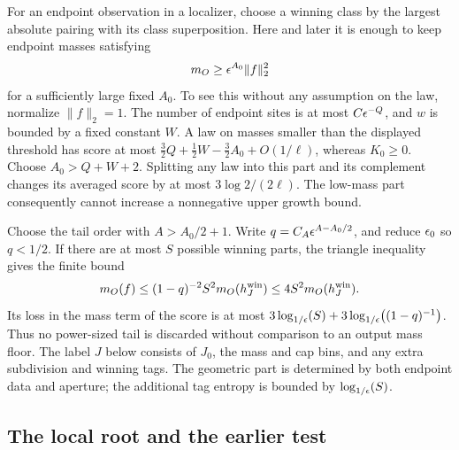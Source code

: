 For an endpoint observation in a localizer, choose a winning class
by the largest absolute pairing with its class superposition.
Here and later it is enough to keep endpoint masses satisfying
\begin{equation}
 m_O\ge\epsilon^{A_0}\|f\|_2^2
 \label{eq:packet-output-floor}
\end{equation}
for a sufficiently large fixed \(A_0\).  To see this without any
assumption on the law, normalize \(\|f\|_2=1\).  The number of
endpoint sites is at most \(C\epsilon^{-Q}\), and \(w\) is bounded
by a fixed constant \(W\).  A law on masses smaller than the
displayed threshold has score at most
\(\frac32 Q+\frac12W-\frac32A_0+O(1/\ell)\), whereas \(K_0\ge0\).
Choose \(A_0>Q+W+2\).  Splitting any law into this part and its
complement changes its averaged score by at most
\(3\log 2/(2\ell)\).  The low-mass part consequently cannot
increase a nonnegative upper growth bound.

Choose the tail order with \(A>A_0/2+1\).  Write
\(q=C_A\epsilon^{A-A_0/2}\), and reduce \(\epsilon_0\) so \(q<1/2\).
If there are at most \(S\) possible winning parts, the triangle
inequality gives the finite bound
\begin{equation}
 m_O(f)\le (1-q)^{-2}S^2m_O(h_J^{\rm win})
          \le4S^2m_O(h_J^{\rm win}).
 \label{eq:packet-winner-mass}
\end{equation}
Its loss in the mass term of the score is at most
\(3\log_{1/\epsilon}\!\left(S\right)+3\log_{1/\epsilon}\!\left((1-q)^{-1}\right)\).
Thus no power-sized tail is discarded without comparison to an
output mass floor.  The label \(J\) below consists of \(J_0\),
the mass and cap bins, and any extra subdivision and winning tags.
The geometric part is determined by both endpoint data and aperture;
the additional tag entropy is bounded by \(\log_{1/\epsilon}\!\left(S\right)\).

\subsection{The local root and the earlier test}

